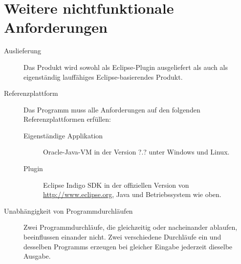 \section{Weitere nichtfunktionale Anforderungen}%

\begin{description}%
    \item [Auslieferung] Das Produkt wird sowohl als Eclipse-Plugin ausgeliefert als auch als eigenständig lauffähiges Eclipse-basierendes Produkt.
    \item [Referenzplattform] Das Programm muss alle Anforderungen auf den folgenden Referenzplattformen erfüllen:
    \begin{description}
      \item [Eigenständige Applikation] Oracle-Java-VM in der Version ?.? unter Windows und Linux.
      \item [Plugin] Eclipse Indigo SDK in der offiziellen Version von \url{http://www.eclipse.org}, Java und Betriebssystem wie oben.
    \end{description}
    \item [Unabhängigkeit von Programmdurchläufen] Zwei Programmdurchläufe, die gleichzeitig oder nacheinander ablaufen, beeinflussen einander nicht. Zwei verschiedene Durchläufe ein und desselben Programms erzeugen bei gleicher Eingabe jederzeit dieselbe Ausgabe.
\end{description}
